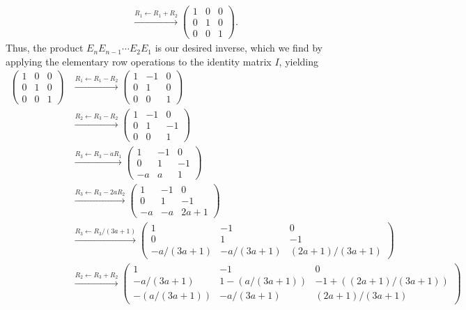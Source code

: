 \documentclass[10pt]{mypackage}
\begin{document}
\begin{solution}
\begin{enumerate}[(a)]
\begin{align*}
                           &\xrightarrow{R_1 \leftarrow R_1 + R_2} \begin{pmatrix}1 & 0 & 0 \\ 0 & 1 & 0 \\ 0 & 0 & 1\end{pmatrix}.
      \end{align*}
      Thus, the product $E_nE_{n-1}\cdots E_2E_1$ is our desired inverse, which we find by applying the elementary row operations to the identity matrix $I$, yielding
      \begin{align*}
        \begin{pmatrix}1 & 0 & 0 \\ 0 & 1 & 0 \\ 0 & 0 & 1\end{pmatrix} &\xrightarrow{R_1 \leftarrow R_1-R_2} \begin{pmatrix}1 & -1 & 0 \\ 0 & 1 & 0 \\ 0 & 0 & 1\end{pmatrix}\\
                         &\xrightarrow{R_2 \leftarrow R_3-R_2} \begin{pmatrix}1 & -1 & 0 \\ 0 & 1 & -1 \\ 0 & 0 & 1\end{pmatrix}\\
                         &\xrightarrow{R_3 \leftarrow R_3 - aR_1} \begin{pmatrix}1 & -1 & 0 \\ 0 & 1 & -1 \\ -a & a & 1\end{pmatrix}\\
                         &\xrightarrow{R_3 \leftarrow R_3 - 2aR_2} \begin{pmatrix}1 & -1 & 0 \\ 0 & 1 & -1 \\ -a & -a & 2a+1\end{pmatrix}\\
                         &\xrightarrow{R_3 \leftarrow R_3/(3a+1)} \begin{pmatrix}1 & -1 & 0 \\ 0 & 1 & -1 \\ -a/(3a+1) & -a/(3a+1) & (2a+1)/(3a+1)\end{pmatrix}\\
                         &\xrightarrow{R_2 \leftarrow R_3 + R_2} \begin{pmatrix}1 & -1 & 0 \\ -a/(3a+1) & 1-\left( a/(3a+1) \right) & -1 + \left( (2a+1)/(3a+1) \right)\\ -\left( a/(3a+1) \right) & -a/(3a+1) & (2a+1)/(3a+1)\end{pmatrix}\\

\end{align*}
\end{enumerate}
\end{solution}
\end{document}
